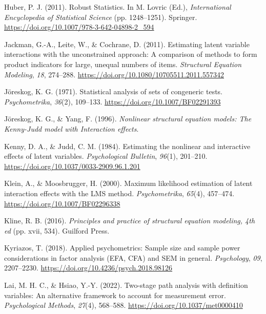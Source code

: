 \documentclass[
  man]{apa6}
\newlength{\cslhangindent}
\newlength{\cslentryspacingunit} %
\newenvironment{CSLReferences}[2] %
 {%
  \setlength{\parindent}{0pt}
  \ifodd #1
  \let\oldpar\par
  \def\par{\hangindent=\cslhangindent\oldpar}
  \fi
  \setlength{\parskip}{#2\cslentryspacingunit}
 }%
 {}
\begin{document}
\begin{CSLReferences}{1}{0}
\leavevmode{}%
Huber, P. J. (2011). Robust {Statistics}. In M. Lovric (Ed.), \emph{International {Encyclopedia} of {Statistical Science}} (pp. 1248--1251). Springer. \url{https://doi.org/10.1007/978-3-642-04898-2_594}

\leavevmode{}%
Jackman, G.-A., Leite, W., \& Cochrane, D. (2011). Estimating latent variable interactions with the unconstrained approach: {A} comparison of methods to form product indicators for large, unequal numbers of items. \emph{Structural Equation Modeling}, \emph{18}, 274--288. \url{https://doi.org/10.1080/10705511.2011.557342}

\leavevmode{}%
Jöreskog, K. G. (1971). Statistical analysis of sets of congeneric tests. \emph{Psychometrika}, \emph{36}(2), 109--133. \url{https://doi.org/10.1007/BF02291393}

\leavevmode{}%
Jöreskog, K. G., \& Yang, F. (1996). \emph{Nonlinear structural equation models: {The Kenny-Judd} model with {Interaction} effects}.

\leavevmode{}%
Kenny, D. A., \& Judd, C. M. (1984). Estimating the nonlinear and interactive effects of latent variables. \emph{Psychological Bulletin}, \emph{96}(1), 201--210. \url{https://doi.org/10.1037/0033-2909.96.1.201}

\leavevmode{}%
Klein, A., \& Moosbrugger, H. (2000). Maximum likelihood estimation of latent interaction effects with the {LMS} method. \emph{Psychometrika}, \emph{65}(4), 457--474. \url{https://doi.org/10.1007/BF02296338}

\leavevmode{}%
Kline, R. B. (2016). \emph{Principles and practice of structural equation modeling, 4th ed} (pp. xvii, 534). Guilford Press.

\leavevmode{}%
Kyriazos, T. (2018). Applied psychometrics: {Sample} size and sample power considerations in factor analysis ({EFA}, {CFA}) and {SEM} in general. \emph{Psychology}, \emph{09}, 2207--2230. \url{https://doi.org/10.4236/psych.2018.98126}

\leavevmode{}%
Lai, M. H. C., \& Hsiao, Y.-Y. (2022). Two-stage path analysis with definition variables: {An} alternative framework to account for measurement error. \emph{Psychological Methods}, \emph{27}(4), 568--588. \url{https://doi.org/10.1037/met0000410}


\end{CSLReferences}
\end{document}
